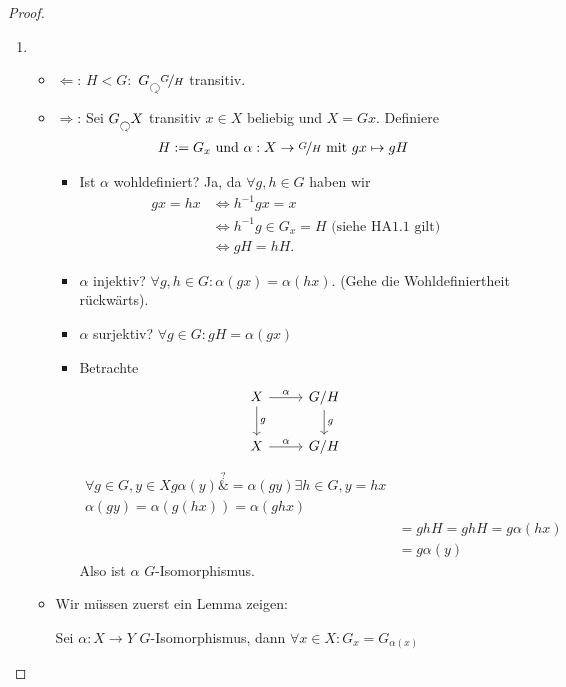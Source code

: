 \begin{proof}
	\begin{enumerate}
		\item 
		\begin{itemize}
			\item $\Leftarrow$: $H < G \colon$ $G \Circlearrowleft \lnkset{G}{H}$ transitiv.
			\item $\Rightarrow$: Sei $G \Circlearrowleft X$ transitiv $x \in X$ beliebig und $X = Gx$. Definiere
			\begin{align*}
				H:= G_x \text{ und } \alpha: X \to \lnkset{G}{H} \mit gx \mapsto gH
			\end{align*} 
			\begin{itemize}
				\item Ist $\alpha$ wohldefiniert? Ja, da $\forall g,h \in G$ haben wir 
				\begin{align*}
				gx = hx &\Leftrightarrow h^{-1}g x = x\\
				&\Leftrightarrow h^{-1}g \in G_x = H \text{ (siehe HA1.1 gilt)}\\
				&\Leftrightarrow gH = hH.
				\end{align*}
				\item $\alpha$ injektiv? $\forall g,h \in G\colon \alpha(gx) = \alpha(hx)$. (Gehe die Wohldefiniertheit rückwärts).
				\item $\alpha$ surjektiv? $\forall g \in G \colon gH = \alpha(gx)$
				\item Betrachte
				\[
					\begin{tikzcd}
					X \arrow[r, "\alpha"] \arrow[d, "g"] & G/H \arrow[d, "g"] \\
					X \arrow[r, "\alpha"]                & G/H               
					\end{tikzcd}
				\]
				\begin{align*}
					\forall g\in G, y \in X g \alpha(y) \overset{?}&{=} \alpha(gy)\exists h \in G, y = hx\\
					\alpha(gy) = \alpha(g(hx)) = \alpha(ghx)\\
					&=ghH = ghH = g\alpha(hx)\\
					&= g \alpha(y)
				\end{align*}
				Also ist $\alpha$ $G$-Isomorphismus.
			\end{itemize}
			\item Wir müssen zuerst ein Lemma zeigen: 
			\begin{lemma}
				Sei $\alpha\colon X \to Y$ $G$-Isomorphismus, dann $\forall x \in X\colon G_x = G_{\alpha(x)}$
			\end{lemma}

\end{itemize}
\end{enumerate}
\end{proof}
